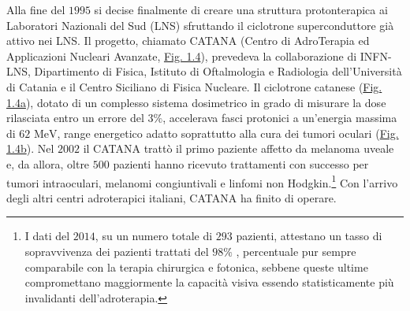 \documentclass[12pt,a4paper,twoside]{report}
\begin{document}
	Alla fine del $1995$ si decise finalmente di creare una struttura protonterapica ai Laboratori Nazionali del Sud (LNS) sfruttando il ciclotrone superconduttore già attivo nei LNS. Il progetto, chiamato CATANA (Centro di AdroTerapia ed Applicazioni Nucleari Avanzate, \hyperref[fig:catana]{Fig. 1.4}), prevedeva la collaborazione di INFN-LNS, Dipartimento di Fisica, Istituto di Oftalmologia e Radiologia dell'Università di Catania e il Centro Siciliano di Fisica Nucleare. Il ciclotrone catanese (\hyperref[fig:catana1]{Fig. 1.4a}), dotato di un complesso sistema dosimetrico in grado di misurare la dose rilasciata entro un errore del $3\%$, accelerava fasci protonici a un'energia massima di $62 \mbox{ MeV}$, range energetico adatto soprattutto alla cura dei tumori oculari (\hyperref[fig:catana2]{Fig. 1.4b}). Nel $2002$ il CATANA trattò il primo paziente affetto da melanoma uveale e, da allora, oltre $500$ pazienti hanno ricevuto trattamenti con successo per tumori intraoculari, melanomi congiuntivali e linfomi non Hodgkin.\footnote{I dati del $2014$, su un numero totale di $293$ pazienti, attestano un tasso di sopravvivenza dei pazienti trattati del $98\%$ \cite{catana_conference}, percentuale pur sempre comparabile con la terapia chirurgica e fotonica, sebbene queste ultime compromettano maggiormente la capacità visiva essendo statisticamente più invalidanti dell'adroterapia.} Con l'arrivo degli altri centri adroterapici italiani, CATANA ha finito di operare.
	
\end{document}
